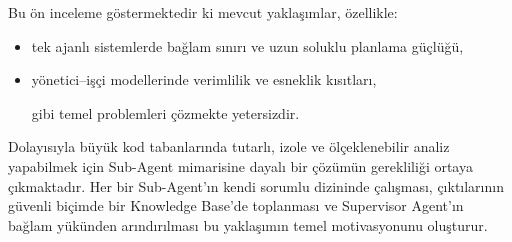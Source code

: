Bu ön inceleme göstermektedir ki mevcut yaklaşımlar, özellikle:

\begin{itemize}
    \item tek ajanlı sistemlerde bağlam sınırı ve uzun soluklu planlama güçlüğü,
    \item yönetici–işçi modellerinde verimlilik ve esneklik kısıtları,

gibi temel problemleri çözmekte yetersizdir.
\end{itemize}

Dolayısıyla büyük kod tabanlarında tutarlı, izole ve ölçeklenebilir analiz yapabilmek için Sub-Agent mimarisine dayalı bir çözümün gerekliliği ortaya çıkmaktadır. Her bir Sub-Agent'ın kendi sorumlu dizininde çalışması, çıktılarının güvenli biçimde bir Knowledge Base'de toplanması ve Supervisor Agent'ın bağlam yükünden arındırılması bu yaklaşımın temel motivasyonunu oluşturur.



